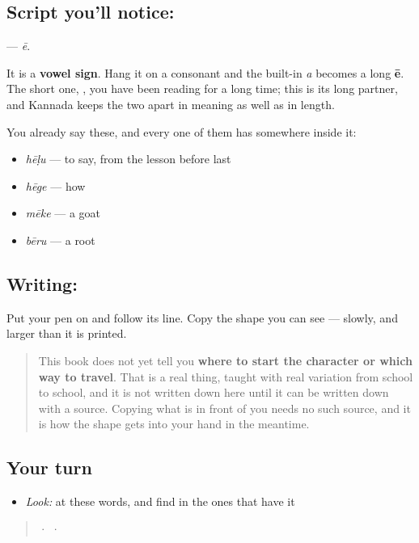 \subsection*{Script you'll notice: }
\textbf{} — \emph{ē}.

It is a \textbf{vowel sign}. Hang it on a consonant and the built-in \emph{a} becomes a long \textbf{ē}. The short one, , you have been reading for a long time; this is its long partner, and Kannada keeps the two apart in meaning as well as in length.

You already say these, and every one of them has  somewhere inside it:

\begin{itemize}
\raggedright
  \item \textbf{} \emph{hēḷu} — to say, from the lesson before last
  \item \textbf{} \emph{hēge} — how
  \item \textbf{} \emph{mēke} — a goat
  \item \textbf{} \emph{bēru} — a root
\end{itemize}

\subsection*{Writing: }
Put your pen on  and follow its line. Copy the shape you can see — slowly, and larger than it is printed.

\begin{quote}
This book does not yet tell you \textbf{where to start the character or which way to travel}. That is a real thing, taught with real variation from school to school, and it is not written down here until it can be written down with a source. Copying what is in front of you needs no such source, and it is how the shape gets into your hand in the meantime.
\end{quote}

\subsection*{Your turn}
\begin{itemize}
\raggedright
  \item \emph{Look:} at these words, and find  in the ones that have it
\end{itemize}

\begin{quote}
  ·    ·  
\end{quote}

